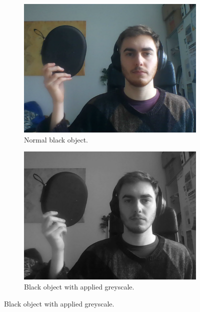 \documentclass{l4proj}
\begin{document}
\begin{appendices}
\begin{figure}[!ht]
    \centering
    \begin{subfigure}{0.42\textwidth}
        \centering
        \includegraphics[width=\textwidth]{images/colour-conversion-black-before.pdf}
        \caption{Normal black object.}
        \label{fig:colour-conversion-black-before} 
    \end{subfigure}
    \begin{subfigure}{0.42\textwidth}
        \centering
        \includegraphics[width=\textwidth]{images/colour-conversion-black-after.pdf}
        \caption{Black object with applied greyscale.}
        \label{fig:colour-conversion-black-after} 
    \end{subfigure}

\end{figure}
\end{appendices}
\end{document}
